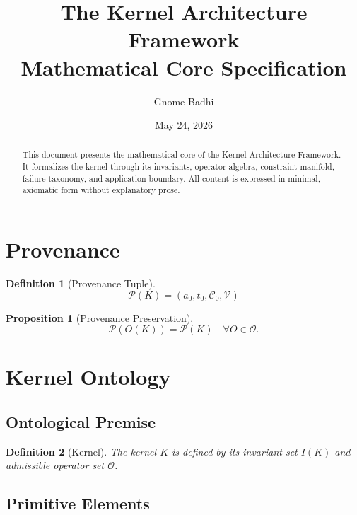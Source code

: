\documentclass[12pt]{article}
\title{\textbf{The Kernel Architecture Framework}\\
\large Mathematical Core Specification}
\author{Gnome Badhi}
\date{May 24, 2026}
\newtheorem{definition}{Definition}[section]
\newtheorem{proposition}{Proposition}[section]
\begin{document}
\maketitle

\begin{abstract}
This document presents the mathematical core of the Kernel Architecture Framework.
It formalizes the kernel through its invariants, operator algebra, constraint manifold,
failure taxonomy, and application boundary. All content is expressed in minimal,
axiomatic form without explanatory prose.
\end{abstract}

\tableofcontents
\newpage

\section{Provenance}

\begin{definition}[Provenance Tuple]
\[
\mathcal{P}(K) = (a_0, t_0, \mathcal{C}_0, \mathcal{V})
\]
\end{definition}

\begin{proposition}[Provenance Preservation]
\[
\mathcal{P}(O(K)) = \mathcal{P}(K) \quad \forall O \in \mathcal{O}.
\]
\end{proposition}

\section{Kernel Ontology}

\subsection{Ontological Premise}

\begin{definition}[Kernel]
The kernel \(K\) is defined by its invariant set \(I(K)\) and admissible operator set \(\mathcal{O}\).
\end{definition}

\subsection{Primitive Elements}
\end{document}
